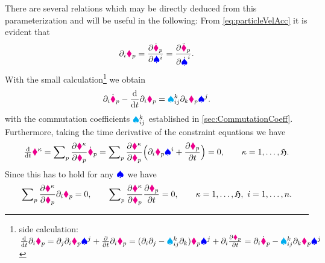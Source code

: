 There are several relations which may be directly deduced from this parameterization and will be useful in the following:
From \eqref{eq:particleVelAcc} it is evident that
\begin{align}\label{eq:IdentityDifferentials}
 \dirDiff{\LidxI} \particlePos{\PidxI} = \pdiff[\particlePosd{\PidxI}]{\sysVelCoeff{\LidxI}} = \pdiff[\particlePosdd{\PidxI}]{\sysVelCoeffd{\LidxI}}.
\end{align}
With the small calculation\footnote{
side calculation:
$
 \diff{t} \dirDiff{\LidxI} \particlePos{\PidxI}
 = \dirDiff{\LidxII} \dirDiff{\LidxI} \particlePos{\PidxI} \sysVelCoeff{\LidxII} + \pdiff{t} \dirDiff{\LidxI} \particlePos{\PidxI}
 = (\dirDiff{\LidxI} \dirDiff{\LidxII} - \BoltzSym{\LidxIII}{\LidxI}{\LidxII} \dirDiff{\LidxIII}) \particlePos{\PidxI} \sysVelCoeff{\LidxII} + \dirDiff{\LidxI} \pdiff[\particlePos{\PidxI}]{t}
 = \dirDiff{\LidxI} \particlePosd{\PidxI} - \BoltzSym{\LidxIII}{\LidxI}{\LidxII} \dirDiff{\LidxIII} \particlePos{\PidxI} \sysVelCoeff{\LidxII}
$
}
we obtain
\begin{align}\label{eq:CommutationParticleVel}
 \dirDiff{\LidxI} \particlePosd{\PidxI} - \diff{t} \dirDiff{\LidxI} \particlePos{\PidxI} = \BoltzSym{\LidxIII}{\LidxI}{\LidxII} \dirDiff{\LidxIII} \particlePos{\PidxI} \sysVelCoeff{\LidxII}.
\end{align}
with the commutation coefficients $\BoltzSym{\LidxIII}{\LidxI}{\LidxII}$ established in \autoref{sec:CommutationCoeff}.
Furthermore, taking the time derivative of the constraint equations we have 
\begin{align}
 \tdiff{t} \particleGeoConstraintCoeff{\CidxI}
 = \sumParticles \pdiff[\particleGeoConstraintCoeff{\CidxI}]{\particlePos{\PidxI}} \particlePosd{\PidxI}
 = \sumParticles \pdiff[\particleGeoConstraintCoeff{\CidxI}]{\particlePos{\PidxI}} \Big( \dirDiff{\LidxI}\particlePos{\PidxI} \sysVelCoeff{\LidxI} + \pdiff[\particlePos{\PidxI}]{t} \Big)
 = 0,
\qquad 
 \CidxI=1,\ldots,\numParticleConstraints.
\end{align}
Since this has to hold for any $\sysVel$ we have
\begin{align}\label{eq:ParticleConstraintIdentity}
 \sumParticles \pdiff[\particleGeoConstraintCoeff{\CidxI}]{\particlePos{\PidxI}} \dirDiff{\LidxI}\particlePos{\PidxI} = 0,
\qquad
 \sumParticles \pdiff[\particleGeoConstraintCoeff{\CidxI}]{\particlePos{\PidxI}} \pdiff[\particlePos{\PidxI}]{t} = 0, 
\qquad 
 \CidxI=1,\ldots,\numParticleConstraints, \ \LidxI=1,\ldots,\dimConfigSpace.
\end{align}



